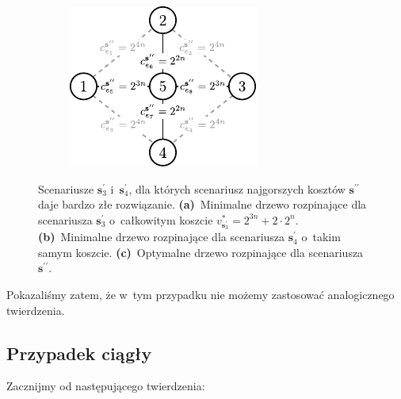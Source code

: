 \begin{figure}[!htbp]
\begin{subfigure}[b]{0.3\textwidth}
		\label{fig:minmaxregexample3:b}
	\end{subfigure}
	\hfill
	\begin{subfigure}[b]{0.3\textwidth}
		\includegraphics[width=\textwidth]{Chapter_II/MIN-MAX-REG3-example/c}
		\caption{}
		\label{fig:minmaxregexample3:c}
	\end{subfigure}
	\hfill\null
	\caption{
		Scenariusze $\textbf{s}_{3}^{\prime}$ i~$\textbf{s}_{4}^{\prime}$, dla których scenariusz najgorszych kosztów $\textbf{s}^{\prime\prime}$ daje bardzo złe rozwiązanie.
		\textbf{(a)}~Minimalne drzewo rozpinające dla scenariusza $\textbf{s}_{3}^{\prime}$ o~całkowitym koszcie $v^{\ast}_{\textbf{s}_{3}^{\prime}} = 2^{3n} + 2 \cdot 2^{n}$.
		\textbf{(b)}~Minimalne drzewo rozpinające dla scenariusza $\textbf{s}_{4}^{\prime}$ o~takim samym koszcie.
		\textbf{(c)}~Optymalne drzewo rozpinające dla scenariusza $\textbf{s}^{\prime\prime}$.
	}
	\label{fig:minmaxregexample3}
\end{figure}

Pokazaliśmy zatem, że w~tym przypadku nie możemy zastosować analogicznego twierdzenia.



\subsection{Przypadek ciągły}



Zacznijmy od następującego twierdzenia:

